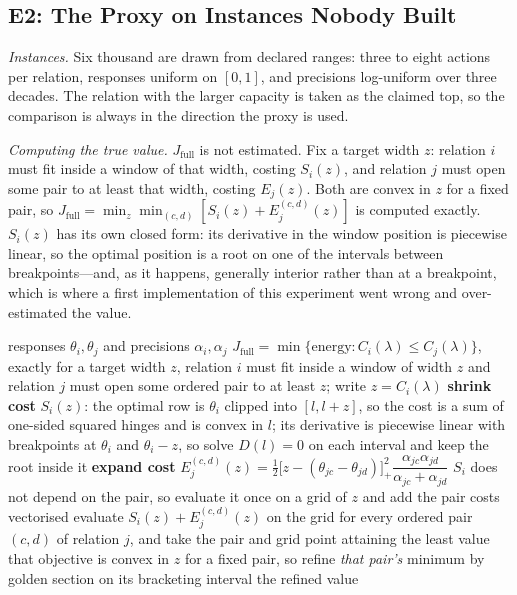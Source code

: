 \subsection{E2: The Proxy on Instances Nobody Built}
\label{sec:e2}

\emph{Instances.} Six thousand are drawn from declared ranges: three to eight actions per
relation, responses uniform on $[0,1]$, and precisions log-uniform over three decades. The
relation with the larger capacity is taken as the claimed top, so the comparison is always in
the direction the proxy is used.

\emph{Computing the true value.} $J_{\mathrm{full}}$ is not estimated. Fix a target width
$z$: relation $i$ must fit inside a window of that width, costing $S_{i}(z)$, and relation
$j$ must open some pair to at least that width, costing $E_{j}(z)$. Both are convex in $z$
for a fixed pair, so $J_{\mathrm{full}}=\min_{z}\min_{(c,d)}[S_{i}(z)+E^{(c,d)}_{j}(z)]$ is
computed exactly. $S_{i}(z)$ has its own closed form: its derivative in the window position
is piecewise linear, so the optimal position is a root on one of the intervals between
breakpoints---and, as it happens, generally interior rather than at a breakpoint, which is
where a first implementation of this experiment went wrong and over-estimated the value.

\begin{algorithm}[htbp]
\caption{Exact least energy of a capacity-inverting alternative}
\label{alg:jfull}
\begin{algorithmic}[1]
\REQUIRE responses $\theta_{i},\theta_{j}$ and precisions $\alpha_{i},\alpha_{j}$
\ENSURE $J_{\mathrm{full}}=\min\{\text{energy}:C_{i}(\lambda)\le C_{j}(\lambda)\}$, exactly
\STATE for a target width $z$, relation $i$ must fit inside a window of width $z$ and
       relation $j$ must open some ordered pair to at least $z$; write $z=C_{i}(\lambda)$
\STATE \textbf{shrink cost } $S_{i}(z)$: the optimal row is $\theta_{i}$ clipped into
       $[l,l+z]$, so the cost is a sum of one-sided squared hinges and is convex in $l$; its
       derivative is piecewise linear with breakpoints at $\theta_{i}$ and $\theta_{i}-z$,
       so solve $D(l)=0$ on each interval and keep the root inside it
\STATE \textbf{expand cost } $E^{(c,d)}_{j}(z)=\tfrac12\bigl[z-(\theta_{jc}-\theta_{jd})\bigr]_{+}^{2}
       \dfrac{\alpha_{jc}\alpha_{jd}}{\alpha_{jc}+\alpha_{jd}}$
\STATE $S_{i}$ does not depend on the pair, so evaluate it once on a grid of $z$ and add the
       pair costs vectorised
\STATE evaluate $S_{i}(z)+E^{(c,d)}_{j}(z)$ on the grid for every ordered pair $(c,d)$ of
       relation $j$, and take the pair and grid point attaining the least value
\STATE that objective is convex in $z$ for a fixed pair, so refine \emph{that pair's}
       minimum by golden section on its bracketing interval
\RETURN the refined value
\end{algorithmic}
\end{algorithm}

